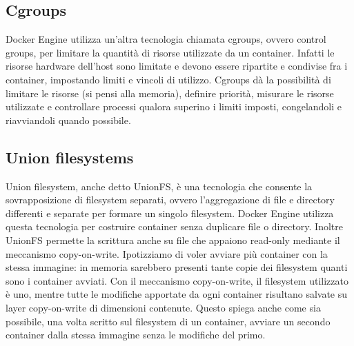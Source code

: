 \subsection{Cgroups}
Docker Engine utilizza un'altra tecnologia chiamata cgroups, ovvero control groups, per limitare la quantità di risorse utilizzate da un container. Infatti le risorse hardware dell'host sono limitate e devono essere ripartite e condivise fra i container, impostando limiti e vincoli di utilizzo. Cgroups dà la possibilità di limitare le risorse (si pensi alla memoria), definire priorità, misurare le risorse utilizzate e controllare processi qualora superino i limiti imposti, congelandoli e riavviandoli quando possibile.

\subsection{Union filesystems}
Union filesystem, anche detto UnionFS, è una tecnologia che consente la sovrapposizione di filesystem separati, ovvero l'aggregazione di file e directory differenti e separate per formare un singolo filesystem. Docker Engine utilizza questa tecnologia per costruire container senza duplicare file o directory. Inoltre UnionFS permette la scrittura anche su file che appaiono read-only mediante il meccanismo copy-on-write. Ipotizziamo di voler avviare più container con la stessa immagine: in memoria sarebbero presenti tante copie dei filesystem quanti sono i container avviati. Con il meccanismo copy-on-write, il filesystem utilizzato è uno, mentre tutte le modifiche apportate da ogni container risultano salvate su layer copy-on-write di dimensioni contenute. Questo spiega anche come sia possibile, una volta scritto sul filesystem di un container, avviare un secondo container dalla stessa immagine senza le modifiche del primo.

